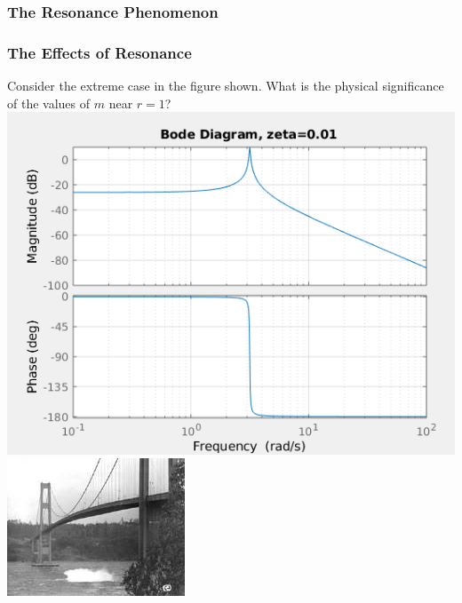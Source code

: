\documentclass[fleqn]{beamer} %
\newcommand{\sectionIVsubsectionIItitle}{The Resonance Phenomenon}
\begin{document}
			\begin{frame}
				\frametitle{\sectionIVsubsectionIItitle}
				\bigskip

				\frametitle{The Effects of Resonance}

				\small

				Consider the extreme case in the figure shown. What is the physical significance of the values of $m$ near $r=1$?  \vspc
				\includegraphics[scale=.25]{images/lecture4_fig3.png}\hspace{10mm} \includegraphics[scale=.6]{images/galloping_gertie_02.jpg}  \vspc

				\btVFill
			\end{frame}
\end{document}
